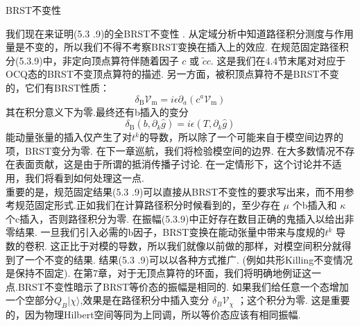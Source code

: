 \centerline{\Large BRST不变性}
我们现在来证明(5.3 .9)的全BRST不变性 . 从定域分析中知道路径积分测度与作用量是不变的，所以我们不得不考察BRST变换在插入上的效应. 在规范固定路径积分(5.3.9)中，非定向顶点算符伴随着因子 $c$ 或 $\tilde{c} c$. 这是我们在4.4节末尾对对应于OCQ态的BRST不变顶点算符的描述. 另一方面，被积顶点算符不是BRST不变的，它们有BRST性质：
\begin{equation}
	\delta_{\mathrm{B}} \mathscr{V}_{\mathrm{m}}=i \epsilon \partial_{a}\left(c^{a} \mathscr{V}_{\mathrm{m}}\right)
\end{equation}
其在积分意义下为零.最终还有b插入的变分
\begin{equation}
	\delta_{\mathrm{B}}\left(b, \partial_{k} \hat{g}\right)=i \epsilon\left(T, \partial_{k} \hat{g}\right)
\end{equation}
能动量张量的插入仅产生了对$t^{k}$的导数，所以除了一个可能来自于模空间边界的项，BRST变分为零. 在下一章巡航，我们将检验模空间的边界. 在大多数情况不存在表面贡献，这是由于所谓的抵消传播子讨论. 在一定情形下，这个讨论并不适用，我们将看到如何处理这一点.\\
重要的是，规范固定结果(5.3 .9)可以直接从BRST不变性的要求写出来，而不用参考规范固定形式.正如我们在计算路径积分时候看到的，至少存在 $\mu $ 个b插入和 $\kappa $ 个c插入，否则路径积分为零. 在振幅(5.3.9)中正好存在数目正确的鬼插入以给出非零结果. 一旦我们引入必需的b因子，BRST变换在能动张量中带来与度规的$t^{k}$ 导数的卷积. 这正比于对模的导数，所以我们就像以前做的那样，对模空间积分就得到了一个不变的结果. 结果(5.3 .9)可以以各种方式推广. (例如共形Killing不变情况是保持不固定). 在第7章，对于无顶点算符的环面，我们将明确地例证这一点.BRST不变性暗示了BRST等价态的振幅是相同的. 如果我们给任意一个态增加一个空部分$Q_{B}|\chi\rangle$,效果是在路径积分中插入变分 $\delta_{B} \mathscr{V}_{\chi} $ ；这个积分为零. 这是重要的，因为物理Hilbert空间等同为上同调，所以等价态应该有相同振幅.\\

